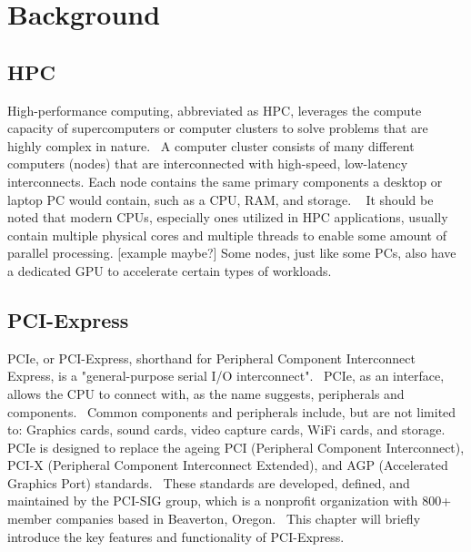 
\chapter{Background}\label{chapter:Background}

\section{HPC}

High-performance computing, abbreviated as HPC, leverages the compute capacity of supercomputers or computer clusters to solve problems that are highly complex in nature.~\parencite{ibm_what_nodate} A computer cluster consists of many different computers (nodes) that are interconnected with high-speed, low-latency interconnects. Each node contains the same primary components a desktop or laptop PC would contain, such as a CPU, RAM, and storage. ~\parencite{iowa_state_university_what_nodate} It should be noted that modern CPUs, especially ones utilized in HPC applications, usually contain multiple physical cores and multiple threads to enable some amount of parallel processing. [example maybe?] Some nodes, just like some PCs, also have a dedicated GPU to accelerate certain types of workloads. ~\parencite{iowa_state_university_what_nodate}
 
\section{PCI-Express}
PCIe, or PCI-Express, shorthand for Peripheral Component Interconnect Express, is a "general-purpose serial I/O interconnect".~\parencite{pci-sig_pci_2011} PCIe, as an interface, allows the CPU to connect with, as the name suggests, peripherals and components.~\parencite{pcmag_definition_nodate} Common components and peripherals include, but are not limited to: Graphics cards, sound cards, video capture cards, WiFi cards, and storage.
PCIe is designed to replace the ageing PCI (Peripheral Component Interconnect), PCI-X (Peripheral Component Interconnect Extended), and AGP (Accelerated Graphics Port) standards.~\parencite{verma_pcie_2017} These standards are developed, defined, and maintained by the PCI-SIG group, which is a nonprofit organization with 800+ member companies based in Beaverton, Oregon.~\parencite{pci-sig_contact_nodate} This chapter will briefly introduce the key features and functionality of PCI-Express.


